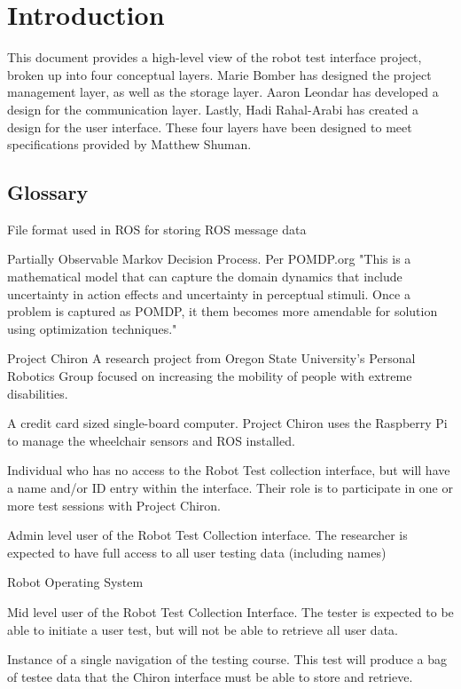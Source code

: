 \documentclass[onecolumn, draftclsnofoot,10pt, compsoc]{report}
\begin{document}
\section{Introduction}
This document provides a high-level view of the robot test interface project, broken up into four conceptual layers. Marie Bomber has designed the project management layer, as well as the storage layer. Aaron Leondar has developed a design for the communication layer. Lastly, Hadi Rahal-Arabi has created a design for the user interface. These four layers have been designed to meet specifications provided by Matthew Shuman.

\subsection{Glossary}
\begin{description}
	\item [Bag] \hfill \break File format used in ROS for storing ROS message data
	\item [POMDP] \hfill \break Partially Observable Markov Decision Process. Per POMDP.org "This is a mathematical model that can capture the domain dynamics that include uncertainty in action effects and uncertainty in perceptual stimuli. Once a problem is captured as POMDP, it them becomes more amendable for solution using optimization techniques."  \cite{POMDP}
	\item Project Chiron \hfill \break A research project from Oregon State University's Personal Robotics Group focused on increasing the mobility of people with extreme disabilities\cite{Chiron}. 
	\item [Raspberry Pi] \hfill \break A credit card sized single-board computer. Project Chiron uses the Raspberry Pi to manage the wheelchair sensors and ROS installed.
	\item [Research Participant] \hfill \break Individual who has no access to the Robot Test collection interface, but will have a name and/or ID entry within the interface. Their role is to participate in one or more test sessions with Project Chiron.
	\item [Researcher] \hfill \break Admin level user of the Robot Test Collection interface. The researcher is expected to have full access to all user testing data (including names)
	\item [ROS] \hfill \break Robot Operating System
	\item [Tester] \hfil \break Mid level user of the Robot Test Collection Interface. The tester is expected to be able to initiate a user test, but will not be able to retrieve all user data.
	\item [User Test] \hfill \break Instance of a single navigation of the testing course. This test will produce a bag of testee data that the Chiron interface must be able to store and retrieve.
	
\end{description}
\end{document}
